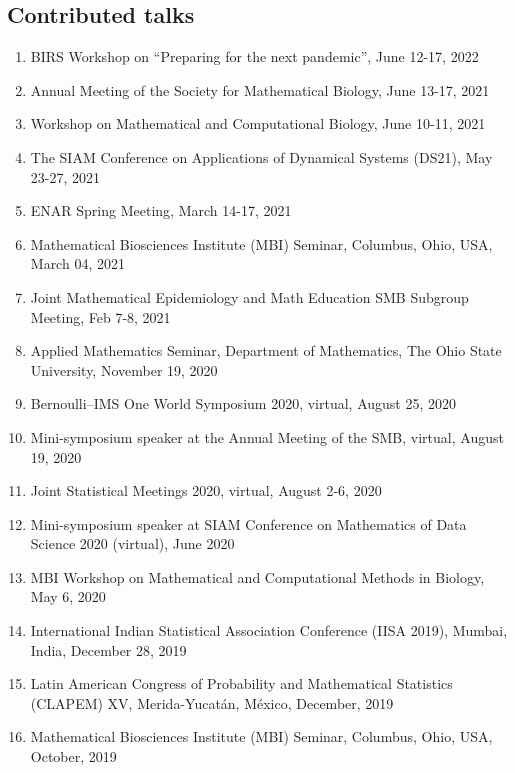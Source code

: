 \documentclass[11pt,a4paper,sans]{moderncv}        %
\begin{document}
\subsection{Contributed talks}
\begin{enumerate}
	\item BIRS Workshop on ``Preparing for the next pandemic'', June 12-17, 2022
	\item Annual Meeting of the Society for Mathematical Biology, June 13-17, 2021
	\item Workshop on Mathematical and Computational Biology, June 10-11, 2021
	\item The SIAM Conference on Applications of Dynamical Systems (DS21), May 23-27, 2021
    \item ENAR Spring Meeting, March 14-17, 2021
	\item Mathematical Biosciences Institute (MBI) Seminar, Columbus, Ohio, USA, March 04, 2021
	\item Joint Mathematical Epidemiology and Math Education SMB Subgroup Meeting, Feb 7-8, 2021
	\item Applied Mathematics Seminar, Department of Mathematics, The Ohio State University, November 19, 2020 
	\item Bernoulli--IMS One World Symposium 2020, virtual, August 25, 2020
	\item Mini-symposium speaker at the Annual Meeting of the SMB, virtual, August 19, 2020
	\item Joint Statistical Meetings 2020, virtual, August 2-6, 2020
	\item {Mini-symposium speaker at SIAM Conference on Mathematics of Data Science 2020 (virtual), June 2020}
	\item {MBI Workshop on Mathematical and Computational Methods in Biology, May 6, 2020}
	\item {International Indian Statistical Association Conference (IISA 2019), Mumbai, India, December 28, 2019}
	\item {Latin American Congress of Probability and Mathematical Statistics (CLAPEM) XV, Merida-Yucatán, México, December, 2019}
	\item {Mathematical Biosciences Institute (MBI) Seminar, Columbus, Ohio, USA, October, 2019}

\end{enumerate}
\end{document}

